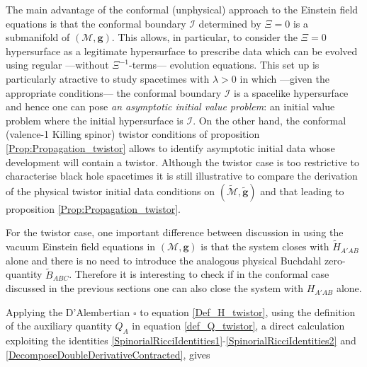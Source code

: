 \documentclass[10pt,a4paper]{article}
\theoremstyle{plain}
\def\bmg{{\bm g}}
\begin{document}
The main advantage of the conformal (unphysical) approach to the
Einstein field equations is that the conformal boundary $\mathscr{I}$
determined by $\Xi=0$ is a submanifold of $(\mathcal{M},\bmg)$. This
allows, in particular, to consider the $\Xi=0$ hypersurface as a
legitimate hypersurface to prescribe data which can be evolved using
regular ---without $\Xi^{-1}$-terms--- evolution equations.  This set up is
particularly atractive to study spacetimes with $\lambda>0$ in which
---given the appropriate conditions--- the conformal boundary $\mathscr{I}$
is a spacelike hypersurface and hence one can pose \emph{an asymptotic
initial value problem}: an initial value problem where the initial
hypersurface is $\mathscr{I}$.
On the other hand, the conformal (valence-1 Killing spinor) twistor conditions
of proposition \eqref{Prop:Propagation_twistor} allows to identify
asymptotic initial data  whose development will
contain a twistor. Although the twistor case is too restrictive to
characterise black hole spacetimes
it is still illustrative to compare the derivation of the physical
twistor initial data conditions on
$(\tilde{\mathcal{M}},\tilde{\bmg})$ and that leading to proposition
\eqref{Prop:Propagation_twistor}.

For the twistor case, one important difference between discussion in
\cite{GasVal15} using the vacuum Einstein field equations in  $(\mathcal{M},\bmg)$
is that the system closes with $\tilde{H}_{A'AB}$ alone and there is no need
to introduce the analogous physical Buchdahl zero-quantity $\tilde{B}_{ABC}$.
Therefore it is interesting to check if in the conformal case discussed
in the previous sections one can also close the system with $H_{A'AB}$ alone.

Applying the D'Alembertian $\square$ to equation
\eqref{Def_H_twistor}, using the definition of the auxiliary quantity
$Q_A$ in equation \eqref{def_Q_twistor}, a direct calculation exploiting the
identities \eqref{SpinorialRicciIdentities1}-\eqref{SpinorialRicciIdentities2}
and \eqref{DecomposeDoubleDerivativeContracted}, gives
\end{document}
